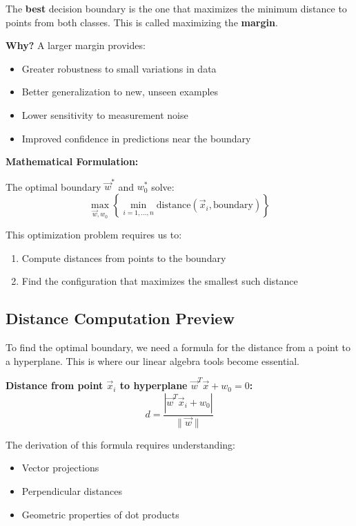 \documentclass[12pt,a4paper]{article}
\theoremstyle{directpoint}
\theoremstyle{definition}
\begin{document}
\begin{tcolorbox}[enhanced,breakable,colback=green!5!white,colframe=green!75!black,title=Optimal Decision Boundary Principle]
The \textbf{best} decision boundary is the one that maximizes the minimum distance to points from both classes. This is called maximizing the \textbf{margin}.

\textbf{Why?} A larger margin provides:
\begin{itemize}
    \item Greater robustness to small variations in data
    \item Better generalization to new, unseen examples
    \item Lower sensitivity to measurement noise
    \item Improved confidence in predictions near the boundary
\end{itemize}
\end{tcolorbox}

\textbf{Mathematical Formulation:}

The optimal boundary $\vec{w}^*$ and $w_0^*$ solve:
\begin{equation}
\max_{\vec{w}, w_0} \left\{ \min_{i=1,\ldots,n} \text{distance}(\vec{x}_i, \text{boundary}) \right\}
\end{equation}

This optimization problem requires us to:
\begin{enumerate}
    \item Compute distances from points to the boundary
    \item Find the configuration that maximizes the smallest such distance
\end{enumerate}

\subsection{Distance Computation Preview}

To find the optimal boundary, we need a formula for the distance from a point to a hyperplane. This is where our linear algebra tools become essential.

\textbf{Distance from point $\vec{x}_i$ to hyperplane $\vec{w}^T\vec{x} + w_0 = 0$:}
\begin{equation}
d = \frac{|\vec{w}^T\vec{x}_i + w_0|}{\|\vec{w}\|}
\end{equation}

The derivation of this formula requires understanding:
\begin{itemize}
    \item Vector projections
    \item Perpendicular distances
    \item Geometric properties of dot products
\end{itemize}
\end{document}
